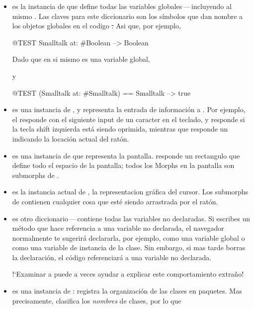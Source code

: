 \documentclass[a4paper,10pt,twoside]{book}
\begin{document}
\begin{itemize}
\item
{} es la instancia de  que define todas las variables globales\,---\,incluyendo al mismo .   
Las claves para este diccionario son los s\'imbolos que dan nombre a los objetos globales en el codigo \st.
Asi que, por ejemplo,
\begin{code}{@TEST}
Smalltalk at: #Boolean --> Boolean
\end{code}
Dado que  en si mismo es una variable global,
\begin{code}{}
Smalltalk at: #Smalltalk-->a SystemDictionary(lots of globals)}
\end{code} 
y
\begin{code}{@TEST}
(Smalltalk at: #Smalltalk) == Smalltalk --> true
\end{code}

\item {} es una instancia de , y representa la entrada de informaci\'on a \pharo.
Por ejemplo, el  responde con el siguiente input de un caracter en el teclado, y  responde  si la tecla shift izquierda est\'a siendo oprimida, mientras que  responde un  indicando la locaci\'on actual del rat\'on.

\item {} es una instancia de  que representa la pantalla.
 responde un rectangulo que define todo el espacio de la pantalla; todos los Morphs en la pantalla son submorphs de .

\item 
{} es la instancia actual de , la representacion gr\'afica del cursor.  Los submorphs de  contienen cualquier cosa que est\'e siendo arrastrada por el rat\'on.

\item
{} es otro diccionario\,---\,contiene todas las variables no declaradas.
Si escribes un m\'etodo que hace referencia a una variable no declarada, el navegador normalmente
te sugerir\'a declararla, por ejemplo, como una variable global o como una variable de instancia de la clase.
Sin embargo, si mas tarde borras la declaraci\'on, el c\'odigo referenciar\'a a una variable no declarada.

!`Examinar a  puede a veces ayudar a explicar este comportamiento extra\~no!

\item
{} es una instancia de : registra la organizaci\'on de las clases en paquetes.  Mas precisamente, clasifica los \emph{nombres} de clases, por lo que
\end{itemize}
\end{document}
